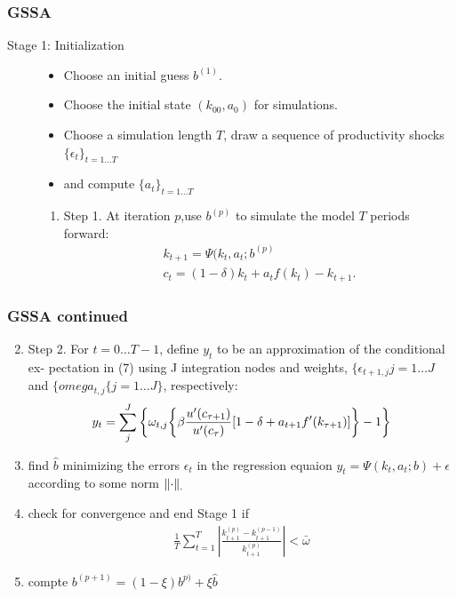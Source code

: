\documentclass[tikz]{beamer}
\begin{document}
 \begin{frame}
   \frametitle{GSSA}

\cite{juddGSSA2011}
 \begin{description}
\item[Stage 1: Initialization]
  \begin{itemize}
  \item  Choose an initial guess $b^{(1)}$.
 \item Choose the initial state $(k_00,a_0)$ for simulations. 
 \item  Choose a simulation length $T$, draw a sequence of 
  productivity shocks $\{\epsilon_t \}_{t=1\ldots T}$
  \item and compute $\{a_t \}_{t =1\ldots T}$
   \end{itemize}
   \begin{enumerate}
   \item 
 Step 1. At iteration $p$,use $b^(p)$ to simulate the model $T$ periods forward:
 \begin{gather}
 k_{t+1} = \Psi(k_t,a_t;b^{(p)}\\
 c_t = (1 − δ)k_t + a_tf(k_t) − k_{t+1}. 
 \end{gather}

   \end{enumerate}
 \end{description}

 \end{frame}


 \begin{frame}
   \frametitle{GSSA continued}

{\small
   \begin{enumerate}
\setcounter{enumi}{1}
 \item  Step 2. For $t = 0\ldots T − 1$, define $y_t$ to be an approximation of the conditional ex- pectation in (7) using J integration nodes and weights, $\{\epsilon_{t+1,j}j=1\ldots J$ and $\{omega_{t,j}\{j=1\ldots J\}$, respectively:
   \begin{gather}
     y_t=\sum_j^J \left \{ \omega_{t,j}  {\left \{ \beta \frac{u^\prime(c_{\tau+1})}{u^\prime(c_{\tau})} [1- \delta + a_{t+1}f^\prime(k_{\tau+1})] \right \} -1} \right \}
   \end{gather}
 \item find $\hat{b}$ minimizing the errors $\epsilon_t$ in the regression equaion $ y_{t}=\Psi(k_t,a_t;b) + \epsilon$ according to some norm $\left\lVert\cdot\right\rVert_\cdot$
\item check for convergence and end Stage 1 if
  \begin{gather}
    \frac{1}{T}\sum_{t=1}^T \left | \frac{k_{t+1}^{(p)}-k_{t+1}^{(p-1)}}{k_{t+1}^{(p)}} \right | < \bar{\omega}
  \end{gather}
 \item compte $b^{(p+1)}= (1-\xi)b^{p)} + \xi \hat{b}$
   \end{enumerate}
}
 \end{frame}
\end{document}
